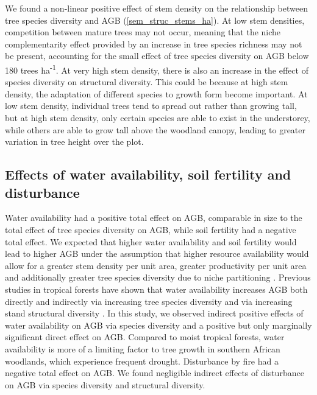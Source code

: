 \documentclass[11pt,a4paper]{article}
\newcommand{\textapprox}{\raisebox{0.5ex}{\texttildelow}}  %
\begin{document}
We found a non-linear positive effect of stem density on the relationship between tree species diversity and AGB (\autoref{sem_struc_stems_ha}). At low stem densities, competition between mature trees may not occur, meaning that the niche complementarity effect provided by an increase in tree species richness may not be present, accounting for the small effect of tree species diversity on AGB below \textapprox{}180 trees ha\textsuperscript{-1}. At very high stem density, there is also an increase in the effect of species diversity on structural diversity. This could be because at high stem density, the adaptation of different species to growth form become important. At low stem density, individual trees tend to spread out rather than growing tall, but at high stem density, only certain species are able to exist in the understorey, while others are able to grow tall above the woodland canopy, leading to greater variation in tree height over the plot.

\subsection{Effects of water availability, soil fertility and disturbance}

Water availability had a positive total effect on AGB, comparable in size to the total effect of tree species diversity on AGB, while soil fertility had a negative total effect. We expected that higher water availability and soil fertility would lead to higher AGB under the assumption that higher resource availability would allow for a greater stem density per unit area, greater productivity per unit area and additionally greater tree species diversity due to niche partitioning \citep{Kraaij2006, Shirima2015}. Previous studies in tropical forests have shown that water availability increases AGB both directly and indirectly via increasing tree species diversity and via increasing stand structural diversity \citep{Ali2019a, Ali2019b, Poorter2017}. In this study, we observed indirect positive effects of water availability on AGB via species diversity and a positive but only marginally significant direct effect on AGB. Compared to moist tropical forests, water availability is more of a limiting factor to tree growth in southern African woodlands, which experience frequent drought. Disturbance by fire had a negative total effect on AGB. We found negligible indirect effects of disturbance on AGB via species diversity and structural diversity. 
\end{document}
